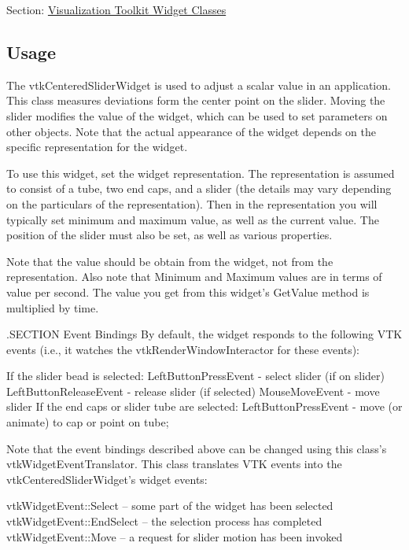 Section\-: \hyperlink{sec_vtkwidgets}{Visualization Toolkit Widget Classes} \hypertarget{vtkwidgets_vtkxyplotwidget_Usage}{}\subsection{Usage}\label{vtkwidgets_vtkxyplotwidget_Usage}
The vtk\-Centered\-Slider\-Widget is used to adjust a scalar value in an application. This class measures deviations form the center point on the slider. Moving the slider modifies the value of the widget, which can be used to set parameters on other objects. Note that the actual appearance of the widget depends on the specific representation for the widget.

To use this widget, set the widget representation. The representation is assumed to consist of a tube, two end caps, and a slider (the details may vary depending on the particulars of the representation). Then in the representation you will typically set minimum and maximum value, as well as the current value. The position of the slider must also be set, as well as various properties.

Note that the value should be obtain from the widget, not from the representation. Also note that Minimum and Maximum values are in terms of value per second. The value you get from this widget's Get\-Value method is multiplied by time.

.S\-E\-C\-T\-I\-O\-N Event Bindings By default, the widget responds to the following V\-T\-K events (i.\-e., it watches the vtk\-Render\-Window\-Interactor for these events)\-: 
\begin{DoxyPre}
 If the slider bead is selected:
   LeftButtonPressEvent - select slider (if on slider)
   LeftButtonReleaseEvent - release slider (if selected)
   MouseMoveEvent - move slider
 If the end caps or slider tube are selected:
   LeftButtonPressEvent - move (or animate) to cap or point on tube;
 \end{DoxyPre}


Note that the event bindings described above can be changed using this class's vtk\-Widget\-Event\-Translator. This class translates V\-T\-K events into the vtk\-Centered\-Slider\-Widget's widget events\-: 
\begin{DoxyPre}
   vtkWidgetEvent::Select -- some part of the widget has been selected
   vtkWidgetEvent::EndSelect -- the selection process has completed
   vtkWidgetEvent::Move -- a request for slider motion has been invoked
 \end{DoxyPre}


